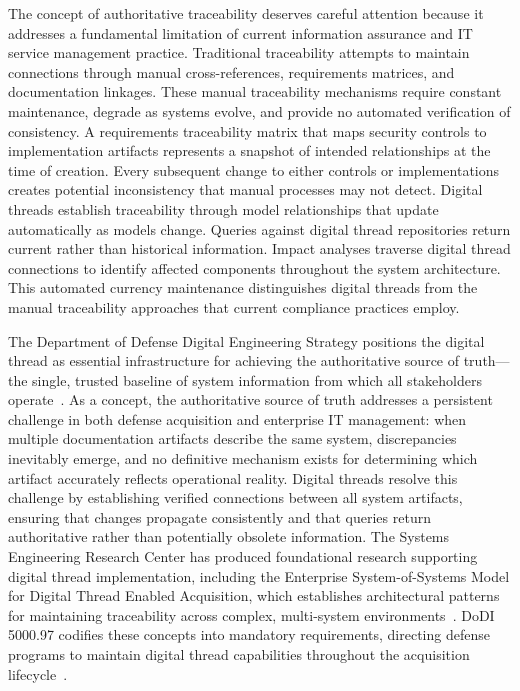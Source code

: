 The concept of authoritative traceability deserves careful attention because it addresses a fundamental limitation of current information assurance and IT service management practice. Traditional traceability attempts to maintain connections through manual cross-references, requirements matrices, and documentation linkages. These manual traceability mechanisms require constant maintenance, degrade as systems evolve, and provide no automated verification of consistency. A requirements traceability matrix that maps security controls to implementation artifacts represents a snapshot of intended relationships at the time of creation. Every subsequent change to either controls or implementations creates potential inconsistency that manual processes may not detect. Digital threads establish traceability through model relationships that update automatically as models change. Queries against digital thread repositories return current rather than historical information. Impact analyses traverse digital thread connections to identify affected components throughout the system architecture. This automated currency maintenance distinguishes digital threads from the manual traceability approaches that current compliance practices employ.

The Department of Defense Digital Engineering Strategy positions the digital thread as essential infrastructure for achieving the authoritative source of truth---the single, trusted baseline of system information from which all stakeholders operate~\parencite{DoD_DE_Strategy_2018}. As a concept, the authoritative source of truth addresses a persistent challenge in both defense acquisition and enterprise IT management: when multiple documentation artifacts describe the same system, discrepancies inevitably emerge, and no definitive mechanism exists for determining which artifact accurately reflects operational reality. Digital threads resolve this challenge by establishing verified connections between all system artifacts, ensuring that changes propagate consistently and that queries return authoritative rather than potentially obsolete information. The Systems Engineering Research Center has produced foundational research supporting digital thread implementation, including the Enterprise System-of-Systems Model for Digital Thread Enabled Acquisition, which establishes architectural patterns for maintaining traceability across complex, multi-system environments~\parencite{SERC_Digital_Thread_2018}. DoDI 5000.97 codifies these concepts into mandatory requirements, directing defense programs to maintain digital thread capabilities throughout the acquisition lifecycle~\parencite{DoDI_5000_97_2023}.

